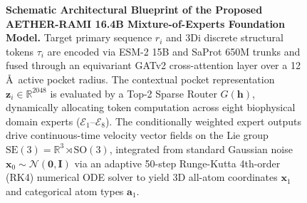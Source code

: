 \documentclass[10pt,journal,compsoc]{IEEEtran}
\begin{document}
\begin{figure}[t]
\begin{tikzpicture}
\end{tikzpicture}
\caption{\textbf{Schematic Architectural Blueprint of the Proposed AETHER-RAMI 16.4B Mixture-of-Experts Foundation Model.} Target primary sequence $r_i$ and 3Di discrete structural tokens $\tau_i$ are encoded via ESM-2 15B and SaProt 650M trunks and fused through an equivariant GATv2 cross-attention layer over a 12\,\AA\ active pocket radius. The contextual pocket representation $\mathbf{z}_i \in \mathbb{R}^{2048}$ is evaluated by a Top-2 Sparse Router $G(\mathbf{h})$, dynamically allocating token computation across eight biophysical domain experts ($\mathcal{E}_1$--$\mathcal{E}_8$). The conditionally weighted expert outputs drive continuous-time velocity vector fields on the Lie group $\mathrm{SE}(3) = \mathbb{R}^3 \rtimes \mathrm{SO}(3)$, integrated from standard Gaussian noise $\mathbf{x}_0 \sim \mathcal{N}(\mathbf{0}, \mathbf{I})$ via an adaptive 50-step Runge-Kutta 4th-order (RK4) numerical ODE solver to yield 3D all-atom coordinates $\mathbf{x}_1$ and categorical atom types $\mathbf{a}_1$.}
\label{fig:proposed_architecture_tikz}
\end{figure}
\end{document}
